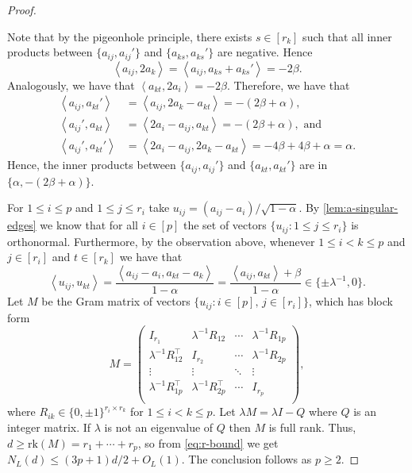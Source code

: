 \documentclass[reqno, 11pt]{amsart}
\theoremstyle{definition}
\theoremstyle{remark}
\newcommand{\ang}[1]{\left\langle #1 \right\rangle}
\begin{document}
\begin{proof}
\begin{enumerate}
        Note that by the pigeonhole principle, there exists $s \in [r_k]$ such that all inner products between $\{a_{ij}, a_{ij}'\}$ and $\{a_{ks}, a_{ks}'\}$ are negative. Hence
        \[
            \ang{a_{ij}, 2a_k} =   \ang{a_{ij}, a_{ks}+a_{ks}'} = -2\beta.
        \]
        Analogously, we have that $\ang{a_{kt},2a_i} = -2\beta$. Therefore, we have that
        \begin{align*}
            \ang{a_{ij}, a_{kt}'} &=  \ang{a_{ij}, 2a_k - a_{kt}} = -(2\beta + \alpha), \\
            \ang{a_{ij}', a_{kt}} &=  \ang{2a_i - a_{ij}, a_{kt}} = -(2\beta + \alpha), \text{ and} \\
            \ang{a_{ij}', a_{kt}'} &=  \ang{2a_i - a_{ij}, 2a_k - a_{kt}} = -4\beta + 4\beta + \alpha = \alpha.
        \end{align*}
        Hence, the inner products between $\{a_{ij}, a_{ij}'\}$ and $\{a_{kt}, a_{kt}'\}$ are in $\{\alpha, -(2\beta + \alpha)\}$.
    \end{enumerate}
    For $1 \leq i \leq p$ and $1 \leq j \leq r_i$ take $u_{ij} = (a_{ij} - a_i)/\sqrt{1-\alpha}$. By \cref{lem:a-singular-edges} we know that for all $i \in [p]$ the set of vectors $\{u_{ij} : 1 \le j \le r_i\}$ is orthonormal. Furthermore, by the observation above, whenever $1 \leq i < k \leq p$ and $j \in [r_i]$ and $t \in [r_k]$ we have that
    \[
        \ang{u_{ij}, u_{kt}} = \frac{\ang{a_{ij}-a_i, a_{kt}-a_k}}{1-\alpha} = \frac{\ang{a_{ij}, a_{kt}} + \beta}{1-\alpha} \in \{\pm \lambda^{-1}, 0\}.
    \]
    Let $M$ be the Gram matrix of vectors $\{u_{ij} : i \in [p], \, j \in [r_i]\}$, which has block form
    \[
        M = \begin{pmatrix}
            I_{r_1} & \lambda^{-1}R_{12} & \cdots & \lambda^{-1} R_{1p} \\
            \lambda^{-1}R_{12}^\intercal & I_{r_2} & \cdots & \lambda^{-1} R_{2p} \\
            \vdots & \vdots & \ddots & \vdots \\
            \lambda^{-1}R_{1p}^\intercal & \lambda^{-1}R_{2p}^\intercal & \cdots & I_{r_p} \\
             \end{pmatrix},
    \]
    where $R_{ik} \in \{0,\pm 1\}^{r_i \times r_k}$ for $1 \leq i < k \leq p$. Let $\lambda M = \lambda I - Q$ where $Q$ is an integer matrix. If $\lambda$ is not an eigenvalue of $Q$ then $M$ is full rank. Thus, $d \geq\mathrm{rk}(M)= r_1 + \cdots + r_p$, so from \cref{eq:r-bound} we get $N_L(d) \leq (3p+1)d/2 + O_L(1)$. The conclusion follows as $p \geq 2$.


\end{proof}
\end{document}
